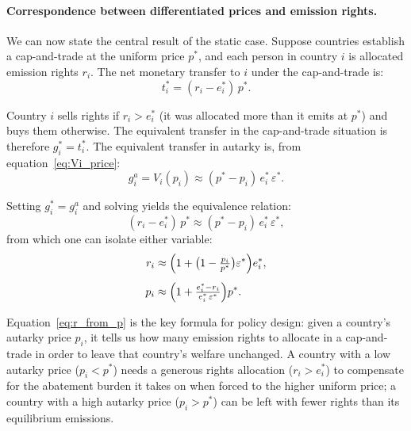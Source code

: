 \documentclass[12pt,english]{article}
\begin{document}
\paragraph{Correspondence between differentiated prices and emission rights.} We can now state the central result of the static case. Suppose countries establish a cap-and-trade at the uniform price $p^*$, and each person in country $i$ is allocated emission rights $r_i$. The net monetary transfer to $i$ under the cap-and-trade is:
\begin{equation}
    t^*_i = (r_i - e^*_i)\,p^*.
\end{equation}

Country $i$ sells rights if $r_i > e^*_i$ (it was allocated more than it emits at $p^*$) and buys them otherwise. The equivalent transfer in the cap-and-trade situation is therefore $g^*_i = t^*_i$. The equivalent transfer in autarky is, from equation~\eqref{eq:Vi_price}:
\begin{equation}
    g^a_i = V_i(p_i) \approx (p^* - p_i)\,e^*_i\,\varepsilon^*.
\end{equation}

Setting $g^*_i = g^a_i$ and solving yields the equivalence relation:
\begin{equation}
    \boxed{(r_i - e^*_i)\,p^* \approx (p^* - p_i)\,e^*_i\,\varepsilon^*,}
    \label{eq:static_equiv}
\end{equation}
from which one can isolate either variable:
\begin{align}
    r_i &\approx \Bigl(1 + \bigl(1 - \tfrac{p_i}{p^*}\bigr)\varepsilon^*\Bigr)
           e^*_i,
           \label{eq:r_from_p} \\[4pt]
    p_i &\approx \Bigl(1 + \tfrac{e^*_i - r_i}{e^*_i\,\varepsilon^*}\Bigr)p^*.
           \label{eq:p_from_r}
\end{align}

Equation~\eqref{eq:r_from_p} is the key formula for policy design: given a country's autarky price $p_i$, it tells us how many emission rights to allocate in a cap-and-trade in order to leave that country's welfare unchanged. A country with a low autarky price ($p_i < p^*$) needs a generous rights allocation ($r_i > e^*_i$) to compensate for the abatement burden it takes on when forced to the higher uniform price; a country with a high autarky price ($p_i > p^*$) can be left with fewer rights than its equilibrium emissions.
\end{document}
